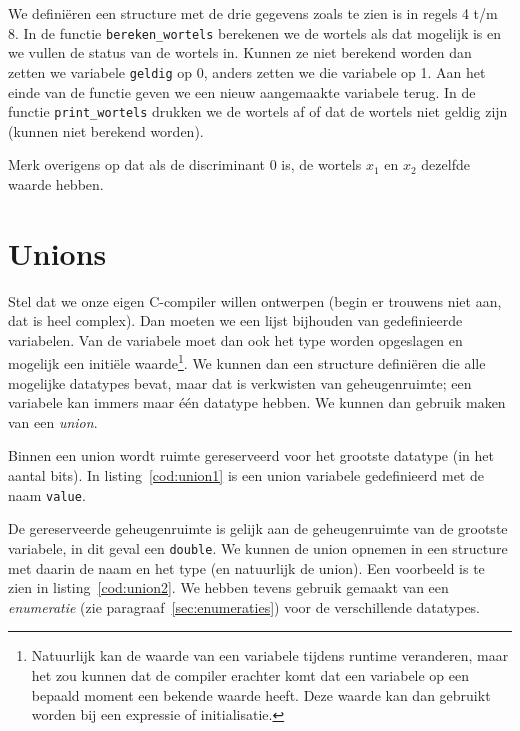 We definiëren een structure met de drie gegevens zoals te zien is in regels 4 t/m 8. In de functie \texttt{bereken\_wortels} berekenen we de wortels als dat mogelijk is en we vullen de status van de wortels in. Kunnen ze niet berekend worden dan zetten we variabele \texttt{geldig} op 0, anders zetten we die variabele op 1. Aan het einde van de functie geven we een nieuw aangemaakte variabele terug. In de functie \texttt{print\_wortels} drukken we de wortels af of dat de wortels niet geldig zijn (kunnen niet berekend worden).

Merk overigens op dat als de discriminant 0 is, de wortels $x_1$ en $x_2$ dezelfde waarde hebben.


\advanced
\section{Unions}
Stel dat we onze eigen C-compiler willen ontwerpen (begin er trouwens niet aan, dat is heel complex). Dan moeten we een lijst bijhouden van gedefinieerde variabelen. Van de variabele moet dan ook het type worden opgeslagen en mogelijk een initiële waarde\footnote{Natuurlijk kan de waarde van een variabele tijdens runtime veranderen, maar het zou kunnen dat de compiler erachter komt dat een variabele op een bepaald moment een bekende waarde heeft. Deze waarde kan dan gebruikt worden bij een expressie of initialisatie.}. We kunnen dan een structure definiëren die alle mogelijke datatypes bevat, maar dat is verkwisten van geheugenruimte; een variabele kan immers maar één datatype hebben. We kunnen dan gebruik maken van een \textsl{union}.

Binnen een union wordt ruimte gereserveerd voor het grootste datatype (in het aantal bits). In listing~\ref{cod:union1} is een union variabele gedefinieerd met de naam \texttt{value}.


De gereserveerde geheugenruimte is gelijk aan de geheugenruimte van de grootste variabele, in dit geval een \texttt{double}. We kunnen de union opnemen in een structure met daarin de naam en het type (en natuurlijk de union). Een voorbeeld is te zien in listing~\ref{cod:union2}. We hebben tevens gebruik gemaakt van een \textsl{enumeratie} (zie paragraaf~\ref{sec:enumeraties}) voor de verschillende datatypes.


